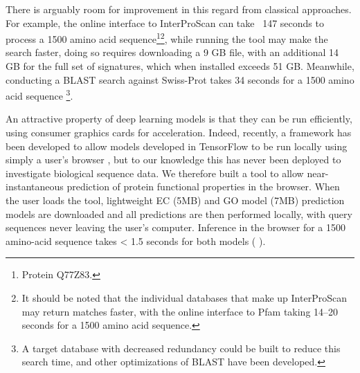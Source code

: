 There is arguably room for improvement in this regard from classical approaches. For example, the online interface to InterProScan can take ~147 seconds to process a 1500 amino acid sequence\footnote{Protein Q77Z83.}\footnote{It should be noted that the individual databases that make up InterProScan may return matches faster, with the online interface to Pfam taking 14--20 seconds for a 1500 amino acid sequence.}, while running the tool may make the search faster, doing so requires downloading a 9 GB file, with an additional 14 GB for the full set of signatures, which when installed exceeds 51 GB. Meanwhile, conducting a BLAST search against Swiss-Prot takes 34 seconds for a 1500 amino acid sequence \footnote{A target database with decreased redundancy could be built to reduce this search time, and other optimizations of BLAST have been developed.}.

An attractive property of deep learning models is that they can be run efficiently, using consumer graphics cards for acceleration. Indeed, recently, a framework has been developed to allow models developed in TensorFlow to be run locally using simply a user's browser \citep{tfjs}, but to our knowledge this has never been deployed to investigate biological sequence data. We therefore built a tool to allow near-instantaneous prediction of protein functional properties in the browser. When the user loads the tool, lightweight EC (5MB) and GO model (7MB) prediction models are downloaded and all predictions are then performed locally, with query sequences never leaving the user's computer. Inference in the browser for a 1500 amino-acid sequence takes < 1.5 seconds for both models (%
).
